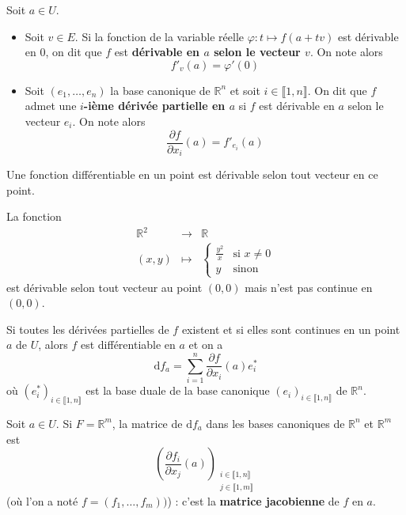   \begin{definition}
    Soit $a \in U$.
    \begin{itemize}
      \item Soit $v \in E$. Si la fonction de la variable réelle $\varphi : t \mapsto f(a+tv)$ est dérivable en $0$, on dit que $f$ est \textbf{dérivable en $a$ selon le vecteur $v$}. On note alors
      \[ f'_v(a) = \varphi'(0) \]
      \item Soit $(e_1, \dots, e_n)$ la base canonique de $\mathbb{R}^n$ et soit $i \in \llbracket 1, n \rrbracket$. On dit que $f$ admet une \textbf{$i$-ième dérivée partielle en $a$} si $f$ est dérivable en $a$ selon le vecteur $e_i$. On note alors
      \[ \frac{\partial f}{\partial x_i}(a) = f'_{e_i}(a) \]
    \end{itemize}
  \end{definition}

  \begin{proposition}
    Une fonction différentiable en un point est dérivable selon tout vecteur en ce point.
  \end{proposition}

  \begin{cexample}
    La fonction
    \[
      \begin{array}{ccc}
        \mathbb{R}^2 &\rightarrow& \mathbb{R} \\
        (x,y) &\mapsto& \begin{cases}
          \frac{y^2}{x} &\text{si } x \neq 0 \\
          y &\text{sinon}
        \end{cases}
      \end{array}
    \]
    est dérivable selon tout vecteur au point $(0,0)$ mais n'est pas continue en $(0,0)$.
  \end{cexample}

  \begin{theorem}
    Si toutes les dérivées partielles de $f$ existent et si elles sont continues en un point $a$ de $U$, alors $f$ est différentiable en $a$ et on a
    \[ \mathrm{d}f_a = \sum_{i=1}^n \frac{\partial f}{\partial x_i}(a) e_i^* \]
    où $(e_i^*)_{i \in \llbracket 1, n \rrbracket}$ est la base duale de la base canonique $(e_i)_{i \in \llbracket 1, n \rrbracket}$ de $\mathbb{R}^n$.
  \end{theorem}

  \begin{application}
    Soit $a \in U$. Si $F = \mathbb{R}^m$, la matrice de $\mathrm{d}f_a$ dans les bases canoniques de $\mathbb{R}^n$ et $\mathbb{R}^m$ est
    \[ \left(\frac{\partial f_i}{\partial x_j}(a)\right)_{\substack{i \in \llbracket 1, n \rrbracket \\ j \in \llbracket 1, m \rrbracket}} \]
    (où l'on a noté $f = (f_1, \dots, f_m))$) : c'est la \textbf{matrice jacobienne} de $f$ en $a$.
  \end{application}

